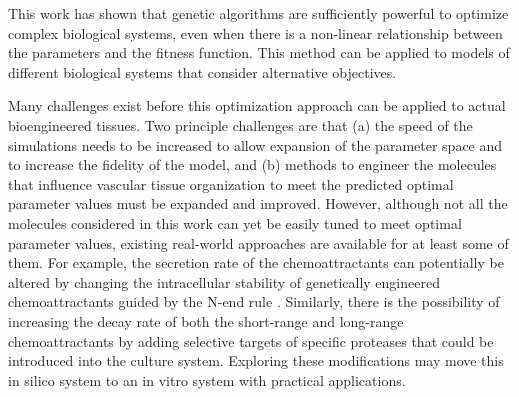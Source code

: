 This work has shown that genetic algorithms are sufficiently powerful to optimize complex biological systems, even when there is a non-linear relationship between the parameters and the fitness function. This method can be applied to models of different biological systems that consider alternative objectives.

Many challenges exist before this optimization approach can be applied to actual bioengineered tissues. Two principle challenges are that (a) the speed of the simulations needs to be increased to allow expansion of the parameter space and to increase the fidelity of the model, and (b) methods to engineer the molecules that influence vascular tissue organization to meet the predicted optimal parameter values must be expanded and improved. However, although not all the molecules considered in this work can yet be easily tuned to meet optimal parameter values, existing real-world approaches are available for at least some of them. For example, the secretion rate of the chemoattractants can potentially be altered by changing the intracellular stability of genetically engineered chemoattractants guided by the N-end rule \cite{Varshavsky2011Nend}.  Similarly, there is the possibility of increasing the decay rate of both the short-range and long-range chemoattractants by adding selective targets of specific proteases that could be introduced into the culture system. Exploring these modifications may move this in silico system to an in vitro system with practical applications.

